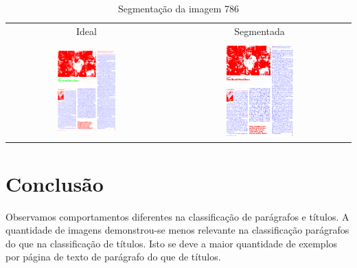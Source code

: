 \documentclass[a4paper,11pt]{article}
\begin{document}
    \begin{table}[p]
      \caption{Segmentação da imagem 786}
      \begin{center}
        \begin{tabular}{ c c }
          Ideal & Segmentada \\
          \includegraphics[width=0.4\textwidth]{assets/final_ideal/time_786_ideal.png}
          &
          \includegraphics[width=0.4\textwidth]{assets/result_imagens/time_50_percent_sparse_9x9_786_final.png}
        \end{tabular}
      \end{center}
      \label{tab:segmentation_786}
    \end{table}

\clearpage

\section{Conclusão}
\label{sec:conclusao}

  Observamos comportamentos diferentes na classificação de parágrafos e títulos. A quantidade de imagens demonstrou-se menos relevante na classificação parágrafos do que na classificação de títulos. Isto se deve a maior quantidade de exemplos por página de texto de parágrafo do que de títulos.
\end{document}
